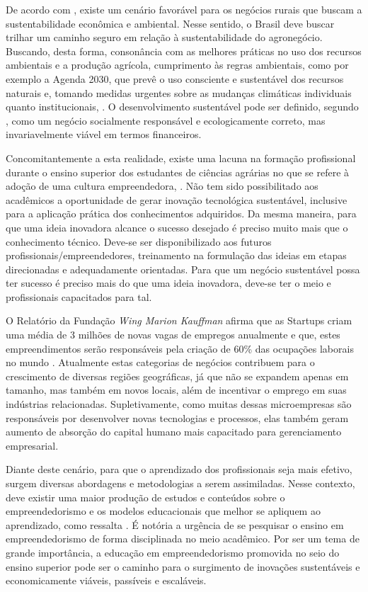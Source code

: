 De acordo com , existe um cenário favorável para os negócios rurais que buscam a sustentabilidade econômica e ambiental. Nesse sentido, o Brasil deve buscar trilhar um caminho seguro em relação à sustentabilidade do agronegócio. Buscando, desta forma, consonância com as melhores práticas no uso dos recursos ambientais e a produção agrícola, cumprimento às regras ambientais, como por exemplo a Agenda 2030, que prevê o uso consciente e sustentável dos recursos naturais e, tomando medidas urgentes sobre as mudanças climáticas individuais quanto institucionais, \cite{filho_documentos_2017}. O desenvolvimento sustentável pode ser definido, segundo \cite{lara_ideologia_2017}, como um negócio socialmente responsável e ecologicamente correto, mas invariavelmente viável em termos financeiros.


Concomitantemente a esta realidade, existe uma lacuna na formação profissional durante o ensino superior dos estudantes de ciências agrárias no que se refere à adoção de uma cultura empreendedora, \cite{araujo_educacao_2019}. Não tem sido possibilitado aos acadêmicos a oportunidade de gerar inovação tecnológica sustentável, inclusive para a aplicação prática dos conhecimentos adquiridos. Da mesma maneira, para que uma ideia inovadora alcance o sucesso desejado é preciso muito mais que o conhecimento técnico. Deve-se ser disponibilizado aos futuros profissionais/empreendedores, treinamento na formulação das ideias em etapas direcionadas e adequadamente orientadas. Para que um negócio sustentável possa ter sucesso é preciso mais do que uma ideia inovadora, deve-se ter o meio e profissionais capacitados para tal. 


O Relatório da Fundação \textit{Wing Marion Kauffman} afirma que as Startups criam uma média de 3 milhões de novas vagas de empregos anualmente e que, estes empreendimentos serão responsáveis pela criação de 60\% das ocupações laborais no mundo \cite{brasil_o_2017}. Atualmente estas categorias de negócios contribuem para o crescimento de diversas regiões geográficas, já que não se expandem apenas em tamanho, mas também em novos locais, além de incentivar o emprego em suas indústrias relacionadas. Supletivamente, como muitas dessas microempresas são responsáveis por desenvolver novas tecnologias e processos, elas também geram aumento de absorção do capital humano mais capacitado para gerenciamento empresarial.


Diante deste cenário, para que o aprendizado dos profissionais seja mais efetivo, surgem diversas abordagens e metodologias a serem assimiladas. Nesse contexto, deve existir uma maior produção de estudos e conteúdos sobre o empreendedorismo e os modelos educacionais que melhor se apliquem ao aprendizado, como ressalta . É notória a urgência de se pesquisar o ensino em empreendedorismo de forma disciplinada no meio acadêmico. Por ser um tema de grande importância, a educação em empreendedorismo promovida no seio do ensino superior pode ser o caminho para o surgimento de inovações sustentáveis e economicamente viáveis, passíveis e escaláveis.

